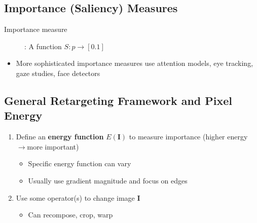 \documentclass[letterpaper,12pt]{article}
\newcommand{\lra}{\ensuremath{\longrightarrow{}}}
\newcommand{\matr}[1]{\mathbf{#1}}
\begin{document}
\subsection{Importance (Saliency) Measures}
\begin{description}
 \item[Importance measure]: A function $S: p \to [0.1]$
\end{description}
\begin{itemize}
 \item More sophisticated importance measures use attention models, eye tracking, gaze studies, face detectors
\end{itemize}

\subsection{General Retargeting Framework and Pixel Energy}
\begin{enumerate}
 \item Define an \textbf{energy function} $E(\matr{I})$ to measure importance (higher energy \lra more important)
       \begin{itemize}
        \item Specific energy function can vary
        \item Usually use gradient magnitude and focus on edges
       \end{itemize}
 \item Use some operator(s) to change image $\matr{I}$
       \begin{itemize}
        \item Can recompose, crop, warp
       \end{itemize}
\end{enumerate}
\end{document}
